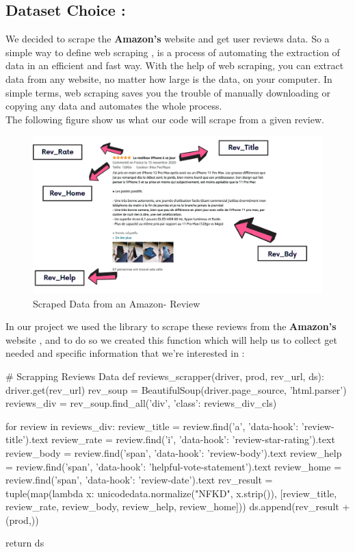 \documentclass{article}
\begin{document}
\subsection{Dataset Choice : }
We decided to scrape the \textcolor{blue}{\faAmazon} \textbf{Amazon's} website and get user reviews data. So a simple way to define web scraping , is a process of automating the extraction of data in an efficient and fast way. With the help of web scraping, you can extract data from any website, no matter how large is the data, on your computer. In simple terms, web scraping saves you the trouble of manually downloading or copying any data and automates the whole process.\\
The following figure show us what our code will scrape from a given review.\\
\begin{figure}[H]
    \centering
    \includegraphics[scale=0.3]{src/img/amazon_review.png}
    \caption{Scraped Data from an Amazon- Review}
    \label{fig:my_label}
\end{figure}
In our project we used the library  to scrape these reviews from the \textbf{Amazon's} website , and to do so we created this  function which will help us to collect get needed and specific information that we're interested in : \\
\begin{code}
# Scrapping Reviews Data
def reviews_scrapper(driver, prod, rev_url, ds):
    driver.get(rev_url)
    rev_soup = BeautifulSoup(driver.page_source, 'html.parser')
    reviews_div = rev_soup.find_all('div', {'class': reviews_div_cls})

    for review in reviews_div:
        review_title = review.find('a', {'data-hook': 'review-title'}).text
        review_rate = review.find('i', {'data-hook': 'review-star-rating'}).text
        review_body = review.find('span', {'data-hook': 'review-body'}).text
        review_help = review.find('span', {'data-hook': 'helpful-vote-statement'}).text
        review_home = review.find('span', {'data-hook': 'review-date'}).text
        rev_result = tuple(map(lambda x:
                               unicodedata.normalize("NFKD", x.strip()),
                               [review_title, review_rate, review_body,
                                review_help, review_home]))
        ds.append(rev_result + (prod,))

    return ds
\end{code}
\end{document}
